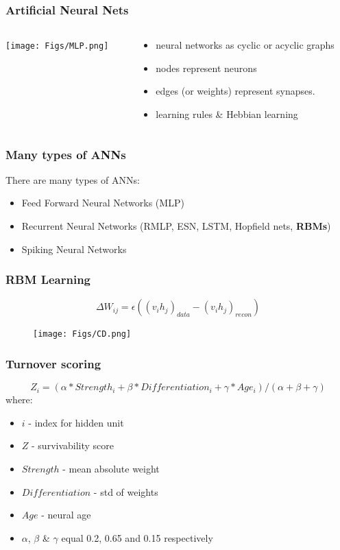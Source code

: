 \documentclass{beamer}
\begin{document}
\begin{frame}
\frametitle{Artificial Neural Nets}
\begin{columns}[T]
\begin{column}[T]{.49\linewidth}
\texttt{[image: Figs/MLP.png]}
\end{column}
\begin{column}[T]{.49\linewidth}
\begin{itemize}
\item neural networks as cyclic or acyclic graphs
\item nodes represent neurons
\item edges (or weights) represent synapses.
\item learning rules \& Hebbian learning
\end{itemize}
\end{column}
\end{columns}
\end{frame}

\begin{frame}
\frametitle{Many types of ANNs}
There are many types of ANNs:
\begin{itemize}
\item Feed Forward Neural Networks (MLP)
\item Recurrent Neural Networks (RMLP, ESN, LSTM, Hopfield nets, \textbf{RBMs})
\item Spiking Neural Networks
\end{itemize}
\end{frame}

\begin{frame}
\frametitle{RBM Learning}
\begin{equation}
\Delta W_{ij} = \epsilon((v_{i}h_{j})_{data} - (v_{i}h_{j})_{recon}) \label{eq.rbm_learning_rule}
\end{equation}
\begin{figure}
\texttt{[image: Figs/CD.png]}
\end{figure}
\end{frame}

\begin{frame}
\frametitle{Turnover scoring}
\begin{equation}
Z_i = (\alpha * Strength_i + \beta * Differentiation_i + \gamma * Age_i) / (\alpha + \beta + \gamma) \label{eq.turnover}
\end{equation}
where:
\small
\begin{itemize}
\item[]$i$ - index for hidden unit
\item[]$Z$ - survivability score
\item[]$Strength$ - mean absolute weight
\item[]$Differentiation$ - std of weights
\item[]$Age$ - neural age
\item[]$\alpha$, $\beta$ \& $\gamma$ equal 0.2, 0.65 and 0.15 respectively 
\end{itemize}
\normalsize
\end{frame}
\end{document}
